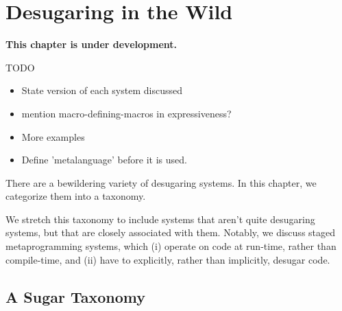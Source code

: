 \chapter{Desugaring in the Wild}\label{chap:taxonomy}

\textbf{This chapter is under development.}

TODO
\begin{itemize}
\item State version of each system discussed
\item mention macro-defining-macros in expressiveness?
\item More examples
\item Define 'metalanguage' before it is used.
\end{itemize}

There are a bewildering variety of desugaring systems.  In this
chapter, we categorize them into a taxonomy.

We stretch this taxonomy to include systems that aren't quite
desugaring systems, but that are closely associated with
them. Notably, we discuss staged metaprogramming systems, which (i)
operate on code at run-time, rather than compile-time, and (ii) have
to explicitly, rather than implicitly, desugar code.

\section{A Sugar Taxonomy}

